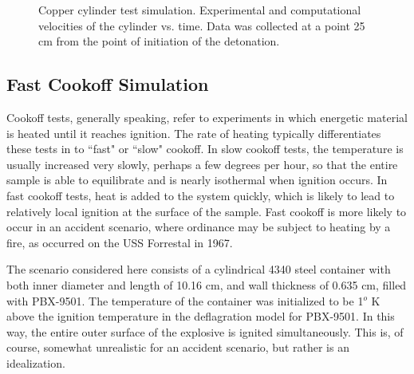 \begin{figure}
  \center
  \caption{Copper cylinder test simulation.  Experimental and computational 
           velocities of the cylinder vs. time. Data was collected at a 
           point 25 cm from the point of initiation of the detonation. }
  \label{figCuRSwallvel}
\end{figure}

\subsection{Fast Cookoff Simulation}

Cookoff tests, generally speaking, refer to experiments in which
energetic material is heated until it reaches ignition.  The rate of
heating typically differentiates these tests in to ``fast" or ``slow"
cookoff.  In slow cookoff tests, the temperature is usually increased
very slowly, perhaps a few degrees per hour, so that the entire sample is able to
equilibrate and is nearly isothermal when ignition occurs.  In fast
cookoff tests, heat is added to the system quickly, which is likely
to lead to relatively local ignition at the surface of the sample.  Fast
cookoff is more likely to occur in an accident scenario, where ordinance
may be subject to heating by a fire, as occurred on the USS Forrestal
in 1967.

The scenario considered here consists of a cylindrical 4340 steel container
with both inner diameter and length of 10.16 cm, and wall thickness of
0.635 cm, filled with PBX-9501.  The temperature of the container
was initialized to be 1$^o$ K above the ignition temperature in the
deflagration model for PBX-9501.  In this way, 
the entire outer surface
of the explosive is ignited simultaneously.  This is, of course, somewhat
unrealistic for an accident scenario, but rather is an idealization.

